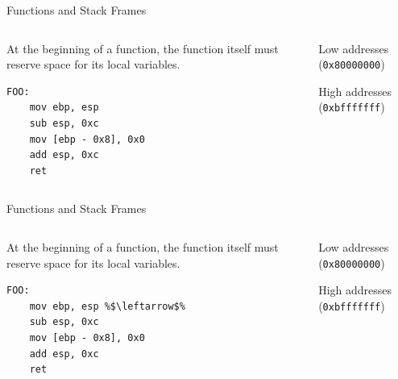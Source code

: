 \documentclass[]{beamer}
\begin{document}
\begin{frame}[fragile]{Functions and Stack Frames}
  \begin{columns}
    \begin{column}{0.45\linewidth}
      At the beginning of a function, the function itself must reserve space for its local variables.
      \begin{lstlisting}[language={[x86masm]Assembler}]
FOO:
    mov ebp, esp
    sub esp, 0xc
    mov [ebp - 0x8], 0x0
    add esp, 0xc
    ret
      \end{lstlisting}
    \end{column}
    \begin{column}{0.4\linewidth}
      \par
      {\scriptsize Low addresses ({\tt 0x80000000})}\\[.5em]
      {\scriptsize High addresses ({\tt 0xbfffffff})}
    \end{column}
  \end{columns}
\end{frame}

\begin{frame}[fragile]{Functions and Stack Frames}
  \begin{columns}
    \begin{column}{0.45\linewidth}
      At the beginning of a function, the function itself must reserve space for its local variables.
      \begin{lstlisting}[language={[x86masm]Assembler}, escapechar=\%]
FOO:
    mov ebp, esp %$\leftarrow$%
    sub esp, 0xc
    mov [ebp - 0x8], 0x0
    add esp, 0xc
    ret
      \end{lstlisting}
    \end{column}
    \begin{column}{0.4\linewidth}
      \par
      {\scriptsize Low addresses ({\tt 0x80000000})}\\[.5em]
      {\scriptsize High addresses ({\tt 0xbfffffff})}
    \end{column}
  \end{columns}
\end{frame}
\end{document}
